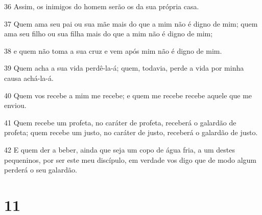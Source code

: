 \par 36 Assim, os inimigos do homem serão os da sua própria casa.
\par 37 Quem ama seu pai ou sua mãe mais do que a mim não é digno de mim; quem ama seu filho ou sua filha mais do que a mim não é digno de mim;
\par 38 e quem não toma a sua cruz e vem após mim não é digno de mim.
\par 39 Quem acha a sua vida perdê-la-á; quem, todavia, perde a vida por minha causa achá-la-á.
\par 40 Quem vos recebe a mim me recebe; e quem me recebe recebe aquele que me enviou.
\par 41 Quem recebe um profeta, no caráter de profeta, receberá o galardão de profeta; quem recebe um justo, no caráter de justo, receberá o galardão de justo.
\par 42 E quem der a beber, ainda que seja um copo de água fria, a um destes pequeninos, por ser este meu discípulo, em verdade vos digo que de modo algum perderá o seu galardão.

\chapter{11}

